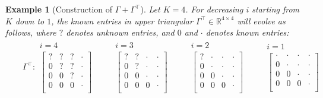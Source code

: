 \documentclass[a4paper,12pt]{article}
\newtheorem{example}{Example}
\theoremstyle{definition}
\begin{document}
\begin{example}[Construction of $\Gamma + \Gamma^\top$]\label{ex:construction_Gamma_Gamma_top}
Let $K=4$. For decreasing $i$ starting from $K$ down to $1$, the known entries in upper triangular $\Gamma^\top \in \mathbb{R}^{4 \times 4}$ will evolve as follows, where $?$ denotes unknown entries, and $0$ and $\cdot$ denotes known entries:
\begin{align*}
    \;\;\;\;\;\;\Gamma^\top:
\begin{array}{c} i = 4 \\
    \begin{bmatrix}
    ? & ? & ? & \cdot \\
    0 & ? & ? & \cdot \\
    0 & 0 & ? & \cdot \\
    0 & 0 & 0 & \cdot \\
\end{bmatrix} \end{array} \qquad
\begin{array}{c} i = 3  \\
\begin{bmatrix}
    ? & ? & \cdot & \cdot \\
    0 & ? & \cdot & \cdot \\
    0 & 0 & \cdot & \cdot \\
    0 & 0 & 0 & \cdot \\
\end{bmatrix} \end{array} \qquad
\begin{array}{c} i = 2 \\
\begin{bmatrix}
    ? & \cdot & \cdot & \cdot \\
    0 & \cdot & \cdot & \cdot \\
    0 & 0 & \cdot & \cdot \\
    0 & 0 & 0 & \cdot \\
\end{bmatrix} \end{array} \qquad
\begin{array}{c} i = 1 \\
\begin{bmatrix}
    \cdot & \cdot & \cdot & \cdot \\
    0 & \cdot & \cdot & \cdot \\
    0 & 0 & \cdot & \cdot \\
    0 & 0 & 0 & \cdot \\
\end{bmatrix} \end{array} \qquad

\end{align*}
\end{example}
\end{document}
